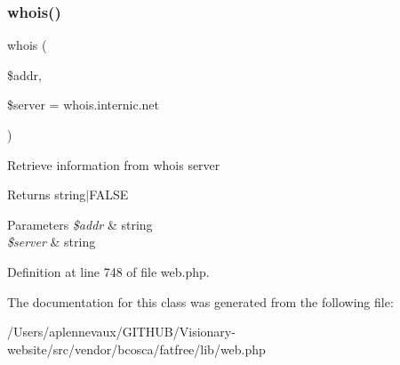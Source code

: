 \hypertarget{class_web_acfaab3ed713ef4f5f14e1de378596d02}{}\label{class_web_acfaab3ed713ef4f5f14e1de378596d02} 
\subsubsection{\texorpdfstring{whois()}{whois()}}
{\footnotesize\ttfamily whois (\begin{DoxyParamCaption}\item[{}]{\$addr,  }\item[{}]{\$server = {\ttfamily \textquotesingle{}whois.internic.net\textquotesingle{}} }\end{DoxyParamCaption})}

Retrieve information from whois server \begin{DoxyReturn}{Returns}
string$\vert$\+F\+A\+L\+SE 
\end{DoxyReturn}

\begin{DoxyParams}{Parameters}
{\em \$addr} & string \\
\hline
{\em \$server} & string \\
\hline
\end{DoxyParams}


Definition at line 748 of file web.\+php.



The documentation for this class was generated from the following file\+:\begin{DoxyCompactItemize}
\item 
/\+Users/aplennevaux/\+G\+I\+T\+H\+U\+B/\+Visionary-\/website/src/vendor/bcosca/fatfree/lib/web.\+php\end{DoxyCompactItemize}
